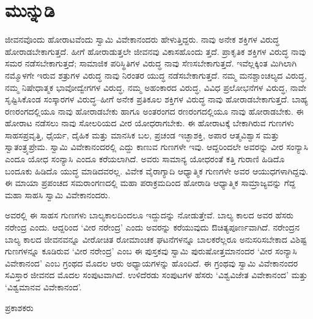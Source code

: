 
\chapter*{ಮುನ್ನುಡಿ}

\noindent

ಜೀವನವೊಂದು ಹೋರಾಟವೆಂದು ಸ್ವಾಮಿ ವಿವೇಕಾನಂದರು ಹೇಳುತ್ತಿದ್ದರು. ನಾವು ಅನೇಕ ಶಕ್ತಿಗಳ ವಿರುದ್ಧ ಹೋರಾಡಬೇಕಾಗುತ್ತದೆ. ಹೀಗೆ ಹೋರಾಡುತ್ತಲೇ ಜೀವನವು ವಿಕಾಸಹೊಂದು ತ್ತದೆ. ಪ್ರಾಕೃತಿಕ ಶಕ್ತಿಗಳ ವಿರುದ್ಧ ನಾವು ಸಮರ ನಡೆಸಬೇಕಾಗುತ್ತದೆ; ಸಾಮಾಜಿಕ ಪರಿಸ್ಥಿತಿಗಳ ವಿರುದ್ಧ ನಾವು ಸೆಣಸಬೇಕಾಗುತ್ತದೆ. ಇವೆಲ್ಲಕ್ಕಿಂತ ಮಿಗಿಲಾಗಿ ನಮ್ಮೊಳಗೇ ಇರುವ ಶತ್ರುಗಳ ವಿರುದ್ಧ ನಾವು ನಿರಂತರ ಯುದ್ಧ ನಡೆಸಬೇಕಾಗುತ್ತದೆ. ನಮ್ಮ ಮನಶ್ಚಾಂಚಲ್ಯದ ವಿರುದ್ಧ, ನಮ್ಮ ನಿಷೇಧಾತ್ಮಕ ಭಾವೋದ್ವೇಗಗಳ ವಿರುದ್ಧ, ನಮ್ಮ ಅಹಂಕಾರದ ವಿರುದ್ಧ, ವಿವಿಧ ಪ್ರಲೋಭನೆಗಳ ವಿರುದ್ಧ, ನಾವೇ ಸೃಷ್ಟಿಸಿಕೊಂಡ ಸಂಸ್ಕಾರಗಳ ವಿರುದ್ಧ–ಹೀಗೆ ಅನೇಕ ಪ್ರತಿಕೂಲ ಶಕ್ತಿಗಳ ವಿರುದ್ಧ ನಾವು ಹೋರಾಡಬೇಕಾಗುತ್ತದೆ. ಬಾಹ್ಯ ರಣರಂಗದಲ್ಲಿಯೂ ನಾವು ಹೋರಾಡಬೇಕು ಹಾಗೂ ಅಂತರಂಗದ ರಣರಂಗದಲ್ಲಿಯೂ ನಾವು ಹೋರಾಡಬೇಕು. ಈ ಹೋರಾಟ ನಡೆಸಲು ನಾವು ಸೋಲರಿಯದ ವೀರ ಯೋಧರಾಗಬೇಕು. ಈ ಹೋರಾಟಕ್ಕೆ ಬೇಕಾಗಿರುವ ಗುಣಗಳು ಸಾಹಸಪ್ರವೃತ್ತಿ, ಧೈರ್ಯ, ದೈಹಿಕ ಮತ್ತು ಮಾನಸಿಕ ಬಲ, ಪ್ರಚಂಡ ಇಚ್ಛಾಶಕ್ತಿ, ಅಪಾರ ಆತ್ಮವಿಶ್ವಾಸ ಮತ್ತು ಸ್ವಾತಂತ್ರ್ಯಪ್ರೇಮ. ಸ್ವಾಮಿ ವಿವೇಕಾನಂದರಲ್ಲಿ ಎದ್ದು ಕಾಣುವ ಗುಣಗಳೇ ಇವು. ಆದ್ದರಿಂದಲೇ ಅವರನ್ನು ವೀರ ಸಂನ್ಯಾಸಿ ಎಂದೂ ಯೋಧ ಸಂನ್ಯಾಸಿ ಎಂದೂ ಕರೆಯಲಾಗಿದೆ. ಅವರು ಸಾಮಾನ್ಯ ಯೋಧರಂತೆ ಕತ್ತಿ ಗುರಾಣಿ ಹಿಡಿದೊ ಬಂದೂಕು ಹಿಡಿದೊ ಯುದ್ಧ ಮಾಡಿದವರಲ್ಲ. ವಿವೇಕ ವೈರಾಗ್ಯಾದಿ ಆಧ್ಯಾತ್ಮಿಕ ಗುಣಗಳೇ ಅವರ ಆಯುಧಗಳಾಗಿದ್ದವು. ಈ ಮಾಯಾ ಪ್ರಪಂಚದ ಸಮರಾಂಗಣದಲ್ಲಿ ಮಹಾ ಪರಾಕ್ರಮದಿಂದ ಹೋರಾಡಿ ಆಧ್ಯಾತ್ಮಿಕ ಸಾಮ್ರಾಜ್ಯವನ್ನು ಗೆದ್ದ ಮಹಾ ಸಾಹಸಿ ಸ್ವಾಮಿ ವಿವೇಕಾನಂದರು.

ಅವರಲ್ಲಿ ಈ ಸಾಹಸ ಗುಣಗಳು ಬಾಲ್ಯಕಾಲದಿಂದಲೂ ಇದ್ದುದನ್ನು ನೋಡುತ್ತೇವೆ. ಬಾಲ್ಯ ಕಾಲದ ಅವರ ಹೆಸರು ನರೇಂದ್ರ ಎಂದು. ಆದ್ದರಿಂದ ‘ವೀರ ನರೇಂದ್ರ’ ಎಂದು ಅವರನ್ನು ಕರೆಯುವುದು ಔಚಿತ್ಯಪೂರ್ಣವಾಗಿದೆ. ನರೇಂದ್ರನ ಬಾಲ್ಯ ಕಾಲದ ಜೀವನವನ್ನೂ ವೀರೋಚಿತ ರೋಮಾಂಚಕ ಘಟನೆಗಳನ್ನೂ ಬಾಲಕರೆಲ್ಲರೂ ಅನುಸರಿಸಬೇಕಾದ ವಿಶಿಷ್ಟ ಗುಣಗಳನ್ನೂ ಕೂಡಿರುವ ‘ವೀರ ನರೇಂದ್ರ’ ಎಂಬ ಈ ಪುಸ್ತಕವು ಸ್ವಾಮಿ ಪುರುಷೋತ್ತಮಾನಂದರ ‘ವೀರ ಸಂನ್ಯಾಸಿ ವಿವೇಕಾನಂದ’ ಎಂಬ ಗ್ರಂಥದ ಮೊದಲ ಆರು ಅಧ್ಯಾಯಗಳನ್ನು ಹೊಂದಿದೆ. ಈ ಗ್ರಂಥವು ಸ್ವಾಮಿ ವಿವೇಕಾನಂದರ ಸವಿಸ್ತಾರ ಜೀವನದ ಮೊದಲ ಸಂಪುಟವಾಗಿದೆ. ಉಳಿದೆರಡು ಸಂಪುಟಗಳ ಹೆಸರು ‘ವಿಶ್ವವಿಜೇತ ವಿವೇಕಾನಂದ’ ಮತ್ತು ‘ವಿಶ್ವಮಾನವ ವಿವೇಕಾನಂದ’.

\begin{flushright}
ಪ್ರಕಾಶಕರು
\end{flushright}

